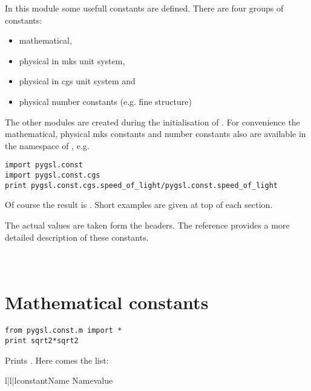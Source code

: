 
In this module some usefull constants are defined.
There are four groups of constants:

\begin{itemize}
\item mathematical,
\item physical in mks unit system,
\item physical in cgs unit system and
\item physical number constants (e.g. fine structure)
\end{itemize}

The other modules are created during the initialisation of .
For convenience the mathematical, physical mks constants and number constants also are available in the namespace of , e.g.
\begin{verbatim}
import pygsl.const
import pygsl.const.cgs
print pygsl.const.cgs.speed_of_light/pygsl.const.speed_of_light
\end{verbatim}
Of course the result is .
Short examples are given at top of each section.

\begin{seealso}
The actual values are taken form the \gsl{} headers.
The \GSL{} reference provides a more detailed description of these constants.
\end{seealso}

\section[\protect\module{pygsl.const.m} --- Mathematical constants]
{\protect{} \\ Mathematical constants} 
\label{cha:const-math-module}

\begin{verbatim}
from pygsl.const.m import *
print sqrt2*sqrt2
\end{verbatim}
Prints . Here comes the list:\nopagebreak
\begin{longtableiii}{l|l|l}{constant}{Name}{\gsl{} Name}{value}
\end{longtableiii}

